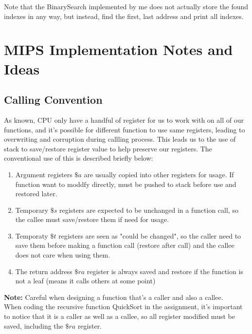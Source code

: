 \documentclass[a4paper]{article}
\begin{document}
Note that the BinarySearch implemented by me does not actually store the found indexes in any way, but instead, find the first, last address and print all indexes.
\section{MIPS Implementation Notes and Ideas}
\subsection{Calling Convention}
As known, CPU only have a handful of register for us to work with on all of our functions, and it's possible for different function to use same registers, leading to overwriting and corruption during callling process. This leads us to the use of stack to save/restore register value to help preserve our registers. The conventional use of this is described briefly below:
\begin{enumerate}
\item Argument registers $\$a$ are usually copied into other registers for usage. If function want to moddfy directly, must be pushed to stack before use and restored later.
\item Temporary $\$s$ registers are expected to be unchanged in a function call, so the callee must save/restore them if need for usage.
\item Temporaty $\$t$ registers are seen as "could be changed", so the caller need to save them before making a function call (restore after call) and the callee does not care when using them.
\item The return address $\$ra$ register is always saved and restore if the function is not a leaf (means it calls others at some point)
\end{enumerate}
\textbf{Note:} Careful when designing a function that's a caller and also a callee.\\
When coding the recursive function QuickSort in the assignment, it's important to notice that it is a caller as well as a callee, so all register modified must be saved, including the $\$ra$ register.
\end{document}
